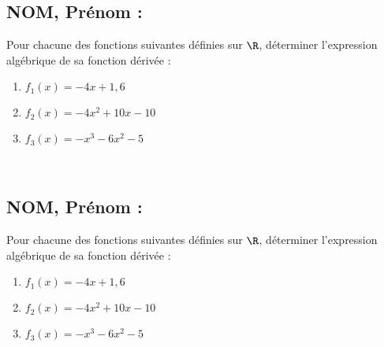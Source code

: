 \documentclass[a4paper,11pt,exos]{nsi} %
\begin{document}
\subsection*{NOM, Prénom : \dotfill} 


\maketitle




\begin{exercice}
    Pour chacune des fonctions suivantes définies sur $\R$, déterminer l'expression algébrique de sa fonction dérivée :
    \begin{multicols}{3}
        \begin{enumerate}
            \item $f_1(x)=-4x+1{,}6$
        
            \item $f_2(x)= -4x^2+10x-10$
            \item $f_3(x)= -x^3-6x^2-5$
        \end{enumerate}
    \end{multicols}
    
    \end{exercice}

\\



\subsection*{NOM, Prénom : \dotfill} 


\maketitle




\begin{exercice}
    Pour chacune des fonctions suivantes définies sur $\R$, déterminer l'expression algébrique de sa fonction dérivée :
    \begin{multicols}{3}
        \begin{enumerate}
            \item $f_1(x)=-4x+1{,}6$
        
            \item $f_2(x)= -4x^2+10x-10$
            \item $f_3(x)= -x^3-6x^2-5$
        \end{enumerate}
    \end{multicols}
    
    \end{exercice}

\end{document}

